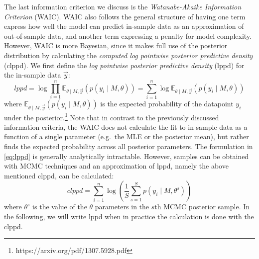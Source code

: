 \documentclass[a4paper,12pt,twoside]{article}
\begin{document}
The last information criterion we discuss is the \textit{Watanabe-Akaike Information Criterion} (WAIC). WAIC also follows the general structure of having one term express how well the model can predict in-sample data as an approximation of out-of-sample data, and another term expressing a penalty for model complexity. However, WAIC is more Bayesian, since it makes full use of the posterior distribution by calculating the \textit{computed log pointwise posterior predictive density} (clppd). We first define the \textit{log pointwise posterior predictive density} (lppd) for the in-sample data $\vec{y}$:
%
\begin{equation}\label{eq:lppd}
lppd = \log \prod_{i=1}^n \mathbb{E}_{\theta \mid M, \vec{y}}(p(y_i \mid M, \theta)) = \sum_{i=1}^n \log  \mathbb{E}_{\theta \mid M, \vec{y}}(p(y_i \mid M, \theta))
\end{equation}
%
where $\mathbb{E}_{\theta \mid M, \vec{y}}(p(y_i \mid M, \theta))$ is the expected probability of the datapoint $y_i$ under the posterior.\footnote{https://arxiv.org/pdf/1307.5928.pdf} Note that in contrast to the previously discussed information criteria, the WAIC does not calculate the fit to in-sample data as a function of a single parameter (e.g.\ the MLE or the posterior mean), but rather finds the expected probability across all posterior parameters. The formulation in \ref{eq:lppd} is generally analytically intractable. However, samples can be obtained with MCMC techniques and an approximation of lppd, namely the above mentioned clppd, can be calculated:
%
\begin{equation}\label{eq:clppd}
clppd = \sum_{i=1}^n \log \left( \frac{1}{S} \sum_{s=1}^S p(y_i \mid M, \theta^s) \right)
\end{equation}
%
where $\theta^s$ is the value of the $\theta$ parameters in the $s$th MCMC posterior sample. In the following, we will write lppd when in practice the calculation is done with the clppd.
\end{document}
